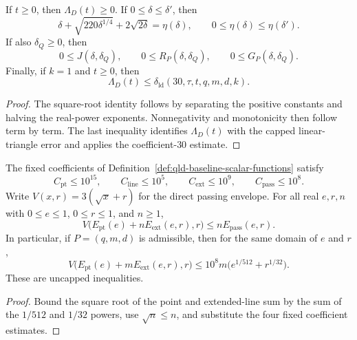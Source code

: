 \begin{theorem}
\label{thm:qld-native-error-scalars}
\leanok
{}
If $t\geq0$, then $\Lambda_D(t)\geq0$.  If
$0\leq\delta\leq\delta'$, then
\[
 \delta+\sqrt{220\delta^{1/4}}+2\sqrt{2\delta}=\eta(\delta),
 \qquad
 0\leq\eta(\delta)\leq\eta(\delta').
\]
If also $\delta_Q\geq0$, then
\[
 0\leq J(\delta,\delta_Q),\qquad
 0\leq R_P(\delta,\delta_Q),\qquad
 0\leq G_P(\delta,\delta_Q).
\]
Finally, if $k=1$ and $t\geq0$, then
\[
 \Lambda_D(t)\leq
 \delta_{\mathrm{ld}}(30,\tau,t,q,m,d,k).
\]
\end{theorem}
\begin{proof}
\leanok
{}
The square-root identity follows by separating the positive constants and
halving the real-power exponents.  Nonnegativity and monotonicity then follow
term by term.  The last inequality identifies $\Lambda_D(t)$ with the capped
linear-triangle error and applies the coefficient-$30$ estimate.
\end{proof}

\begin{theorem}
\label{thm:qld-coefficient-thirty-passing-scalars}
\leanok
{}
The fixed coefficients of
Definition~\ref{def:qld-baseline-scalar-functions} satisfy
\[
 C_{\mathrm{pt}}\leq10^{15},\qquad
 C_{\mathrm{line}}\leq10^5,\qquad
 C_{\mathrm{ext}}\leq10^9,\qquad
 C_{\mathrm{pass}}\leq10^8.
\]
Write $V(x,r)=3(\sqrt{x}+r)$ for the direct passing envelope. For all real
$e,r,n$ with $0\leq e\leq1$, $0\leq r\leq1$, and $n\geq1$,
\[
 V\bigl(E_{\mathrm{pt}}(e)+nE_{\mathrm{ext}}(e,r),r\bigr)
 \leq nE_{\mathrm{pass}}(e,r).
\]
In particular, if $P=(q,m,d)$ is admissible, then for the same domain of
$e$ and $r$,
\[
 V\bigl(E_{\mathrm{pt}}(e)+mE_{\mathrm{ext}}(e,r),r\bigr)
 \leq10^8m\bigl(e^{1/512}+r^{1/32}\bigr).
\]
These are uncapped inequalities.
\end{theorem}
\begin{proof}
\leanok
{}
Bound the square root of the point and extended-line sum by the sum of the
$1/512$ and $1/32$ powers, use $\sqrt n\leq n$, and substitute the four
fixed coefficient estimates.
\end{proof}

